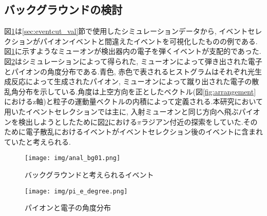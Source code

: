 \subsection{バックグラウンドの検討}\label{sec:anal:background}
図\ref{fig:anal:bg01}は\ref{sec:eventcut_val}節で使用したシミュレーションデータから, イベントセレクションがパイオンイベントと間違えたイベントを可視化したものの例である.図\ref{fig:anal:bg01}に示すようなミューオンが検出器内の電子を弾くイベントが支配的であった.図\ref{fig:pion_electron_degrere}はシミュレーションによって得られた, ミューオンによって弾き出された電子とパイオンの角度分布である.青色, 赤色で表されるヒストグラムはそれぞれ光生成反応によって生成されたパイオン, ミューオンによって蹴り出された電子の散乱角分布を示している.角度は上空方向を正としたベクトル(図\ref{fig:arrangement}におけるz軸)と粒子の運動量ベクトルの内積によって定義される.本研究において用いたイベントセレクションでは主に, 入射ミューオンと同じ方向へ飛ぶパイオンを検出しようとしたために図\ref{fig:pion_electron_degrere}における$\pi$ラジアン付近の探索をしていた.そのために電子散乱におけるイベントがイベントセレクション後のイベントに含まれていたと考えられる.
\begin{figure}[H]
    \centering
    \texttt{[image: img/anal\_bg01.png]}
    \caption{バックグラウンドと考えられるイベント}
    \label{fig:anal:bg01}
\end{figure}
\begin{figure}[H]
    \centering
    \texttt{[image: img/pi\_e\_degree.png]}
    \caption{パイオンと電子の角度分布}
    \label{fig:pion_electron_degrere}
\end{figure}